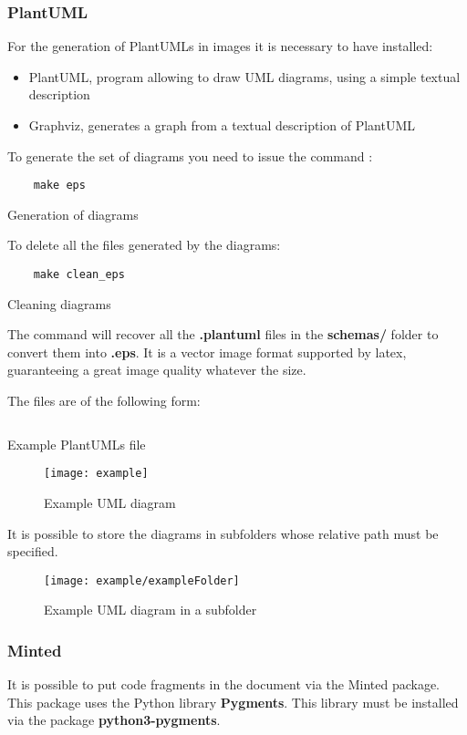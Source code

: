 \subsubsection{PlantUML}
For the generation of PlantUMLs in images it is necessary to have installed:
\begin{itemize}
    \item PlantUML, program allowing to draw UML diagrams, using a simple textual description
    \item Graphviz, generates a graph from a textual description of PlantUML
\end{itemize}

To generate the set of diagrams you need to issue the command :
\begin{code}
    \begin{verbatim}
    make eps
\end{verbatim}
    \caption{Generation of diagrams}
\end{code}

To delete all the files generated by the diagrams:
\begin{code}
    \begin{verbatim}
    make clean_eps
\end{verbatim}
    \caption{Cleaning diagrams}
\end{code}

The command will recover all the \textbf{.plantuml} files
in the \textbf{schemas/} folder to convert them into \textbf{.eps}.
It is a vector image format supported by \gls{latex},
guaranteeing a great image quality whatever the size.

The files are of the following form:
\begin{code}
    \inputminted{vim}{../schemas/example.plantuml}
    \caption{Example PlantUMLs file}
\end{code}

\begin{figure}[H]
    \centering
    \texttt{[image: example]}
    \caption{Example UML diagram}
\end{figure}

It is possible to store the diagrams in subfolders whose relative path must be specified.
\begin{figure}[H]
    \centering
    \texttt{[image: example/exampleFolder]}
    \caption{Example UML diagram in a subfolder}
\end{figure}

\subsubsection{Minted}
It is possible to put code fragments in the document via the Minted package.
This package uses the Python library \textbf{Pygments}.
This library must be installed via the package \textbf{python3-pygments}.

